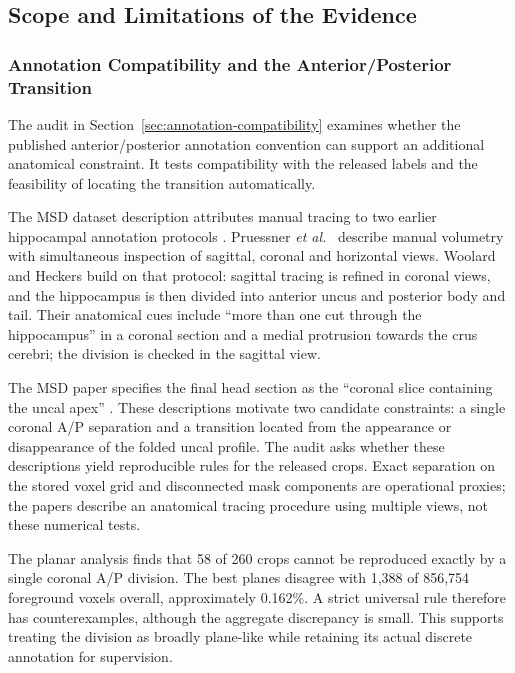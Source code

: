 \documentclass[12pt,a4paper]{article}
\begin{document}
\FloatBarrier
\subsection{Scope and Limitations of the Evidence}
\label{sec:limitations}

\subsubsection{Annotation Compatibility and the Anterior/Posterior Transition}
\label{sec:annotation-results}

The audit in Section~\ref{sec:annotation-compatibility} examines whether
the published anterior/posterior annotation convention can support an
additional anatomical constraint. It tests compatibility with the
released labels and the feasibility of locating the transition
automatically.

The MSD dataset description attributes manual tracing to two earlier
hippocampal annotation protocols \cite{simpson2019dataset}.
Pruessner \emph{et al.}\ \cite{pruessner2000volumetry} describe manual volumetry
with simultaneous inspection of sagittal, coronal and horizontal views.
Woolard and Heckers \cite{woolard2012asymmetry} build on that protocol:
sagittal tracing is refined in coronal views, and the hippocampus is then
divided into anterior uncus and posterior body and tail. Their anatomical
cues include ``more than one cut through the hippocampus'' in a coronal
section and a medial protrusion towards the crus cerebri; the division
is checked in the sagittal view.

The MSD paper specifies the final head section as the ``coronal slice
containing the uncal apex'' \cite{simpson2019dataset}. These descriptions
motivate two candidate constraints: a single coronal A/P separation and
a transition located from the appearance or disappearance of the folded
uncal profile. The audit asks whether these descriptions yield
reproducible rules for the released crops. Exact separation on the stored
voxel grid and disconnected mask components are operational proxies;
the papers describe an anatomical tracing procedure using multiple
views, not these numerical tests.

The planar analysis finds that 58 of 260 crops cannot be reproduced
exactly by a single coronal A/P division. The best planes disagree
with 1,388 of 856,754 foreground voxels overall, approximately
0.162\%. A strict universal rule therefore has counterexamples,
although the aggregate discrepancy is small. This supports treating
the division as broadly plane-like while retaining its actual discrete
annotation for supervision.
\end{document}
